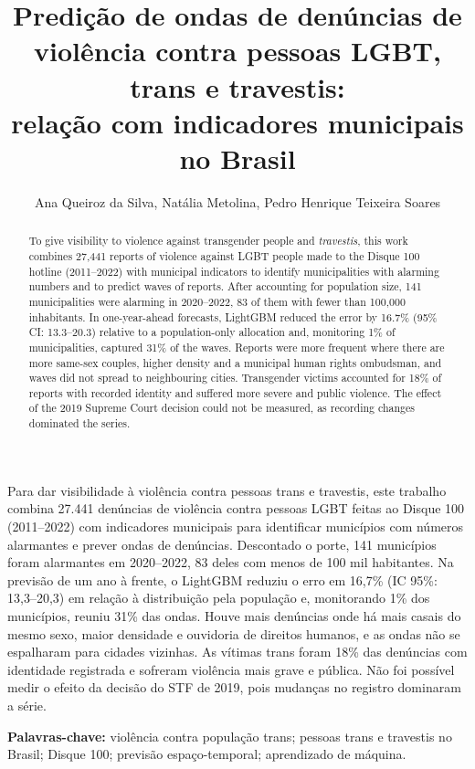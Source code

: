 \documentclass[12pt]{article}
\title{Predição de ondas de denúncias de violência contra pessoas LGBT, trans e travestis: \\ relação com indicadores municipais no Brasil}
\author{Ana Queiroz da Silva, Natália Metolina, Pedro Henrique Teixeira Soares}
\begin{document}
\maketitle
     
\begin{abstract}
To give visibility to violence against transgender people and \textit{travestis}, this work combines 27,441 reports of violence against LGBT people made to the Disque 100 hotline (2011--2022) with municipal indicators to identify municipalities with alarming numbers and to predict waves of reports. After accounting for population size, 141 municipalities were alarming in 2020--2022, 83 of them with fewer than 100,000 inhabitants. In one-year-ahead forecasts, LightGBM reduced the error by 16.7\% (95\% CI: 13.3--20.3) relative to a population-only allocation and, monitoring 1\% of municipalities, captured 31\% of the waves. Reports were more frequent where there are more same-sex couples, higher density and a municipal human rights ombudsman, and waves did not spread to neighbouring cities. Transgender victims accounted for 18\% of reports with recorded identity and suffered more severe and public violence. The effect of the 2019 Supreme Court decision could not be measured, as recording changes dominated the series.
\end{abstract}

\begin{resumo}
Para dar visibilidade à violência contra pessoas trans e travestis, este trabalho combina 27.441 denúncias de violência contra pessoas LGBT feitas ao Disque 100 (2011--2022) com indicadores municipais para identificar municípios com números alarmantes e prever ondas de denúncias. Descontado o porte, 141 municípios foram alarmantes em 2020--2022, 83 deles com menos de 100 mil habitantes. Na previsão de um ano à frente, o LightGBM reduziu o erro em 16,7\% (IC 95\%: 13,3--20,3) em relação à distribuição pela população e, monitorando 1\% dos municípios, reuniu 31\% das ondas. Houve mais denúncias onde há mais casais do mesmo sexo, maior densidade e ouvidoria de direitos humanos, e as ondas não se espalharam para cidades vizinhas. As vítimas trans foram 18\% das denúncias com identidade registrada e sofreram violência mais grave e pública. Não foi possível medir o efeito da decisão do STF de 2019, pois mudanças no registro dominaram a série.

\textbf{Palavras-chave:} violência contra população trans; pessoas trans e travestis no Brasil; Disque 100; previsão espaço-temporal; aprendizado de máquina.
\end{resumo}
\end{document}
